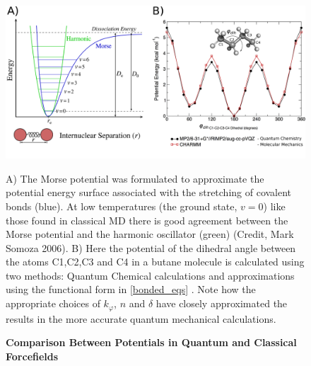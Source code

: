 \begin{figure}
	\begin{center}
	\includegraphics[width=\textwidth]{figures/QM_MM_compared.pdf}
	\end{center}
	\captionsetup{singlelinecheck = false, justification=raggedright}
	\caption[Comparison Between Potentials in Quantum and Classical Forcefields] {\textbf{Comparison Between Potentials in Quantum and Classical Forcefields}}{ A) The Morse potential was formulated to approximate the potential energy surface associated with the stretching of covalent bonds (blue). At low temperatures (the ground state, $v=0$) like those found in classical MD there is good agreement between the Morse potential and the harmonic oscillator (green) (Credit, Mark Somoza 2006). B) Here the potential of the dihedral angle between the atoms C1,C2,C3 and C4 in a butane molecule is calculated using two methods: Quantum Chemical calculations and approximations using the functional form in \ref{bonded_eqs} \cite{lemkul2020}. Note how the appropriate choices of $k_\varphi$, $n$ and $\delta$ have closely approximated the results in the more accurate quantum mechanical calculations.}
 
	\label{QM_MM_compared}
\end{figure}

